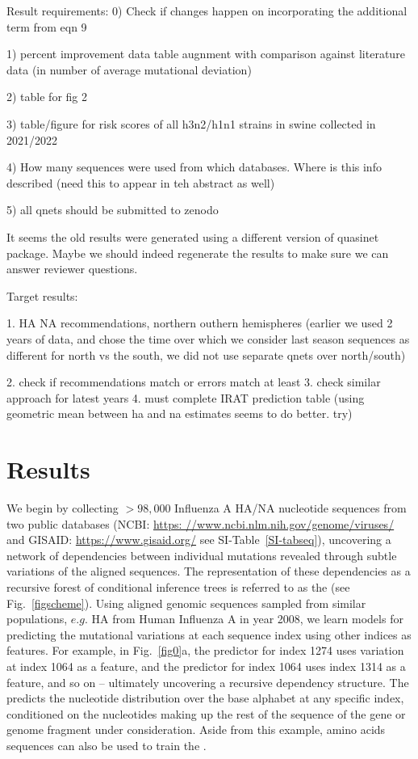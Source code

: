 \documentclass[onecolumn, compsoc,10pt]{IEEEtran}
\begin{document}
  {\color{magenta}
    Result requirements:
    0) Check if changes happen on incorporating the additional term from eqn 9
    
    1) percent improvement data table augnment with comparison against literature data (in number of average mutational deviation)
    
    2) table for fig 2
    
    3) table/figure for risk scores of all h3n2/h1n1 strains in swine collected in 2021/2022
    
    4) How many sequences were used from which databases. Where is this info described (need this to appear in teh abstract as well)
    
    5) all qnets should be submitted to zenodo


    It seems the old results were generated using a different version of quasinet package. Maybe we should indeed regenerate the results to make sure we can answer reviewer questions.

    Target results:

    1. HA NA recommendations, northern outhern hemispheres (earlier we used 2 years of data, and chose the time over which we consider last season sequences as different for north vs the south, we did not use separate qnets over north/south)

    2. check if recommendations match or errors match at least
    3. check similar approach for latest years
    4. must complete IRAT prediction table (using geometric mean between ha and na estimates seems to do better. try)


  }


\section*{Results}

We begin by collecting  $>98,000$ Influenza A HA/NA nucleotide sequences from two public databases (NCBI:  \href{https://www.ncbi.nlm.nih.gov/genome/viruses/}{https: //www.ncbi.nlm.nih.gov/genome/viruses/}
and GISAID:  \href{https://www.gisaid.org/}{https://www.gisaid.org/}
see SI-Table~\ref{SI-tabseq}), uncovering a network of  dependencies between individual mutations revealed through subtle variations of the aligned sequences. The representation of these dependencies as a recursive forest of conditional inference trees is referred to as the \enet (see Fig.~\ref{figscheme}). 
%
Using aligned genomic sequences sampled from  similar populations, $e.g.$ HA from Human Influenza A in year 2008, we  learn models for predicting the mutational variations at each sequence index using other indices  as features. For example, in Fig.~\ref{fig0}a,  the predictor for index 1274 uses variation at index 1064 as a feature, and the predictor for index 1064 uses index 1314 as a feature, and so on -- ultimately uncovering a recursive dependency structure. The \qnet predicts the nucleotide distribution over the base alphabet at any specific index, conditioned on the nucleotides making up the rest of the sequence of the gene or genome fragment under consideration. Aside from this example, amino acids sequences can also be used to train the \qnet.
\end{document}
